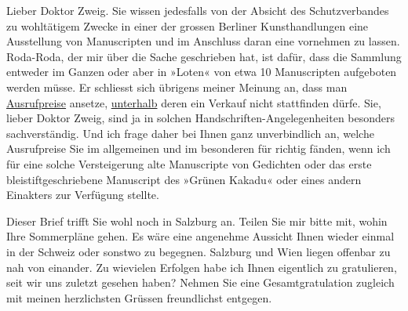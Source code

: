 \pstart{}Lieber Doktor Zweig.\pend\vspace{0.5em}
\pstart
           Sie wissen jedesfalls von der Absicht des Schutzverbandes zu wohltätigem Zwecke in einer der grossen Berliner Kunsthandlungen eine Ausstellung von Manuscripten und
               im Anschluss daran eine \label{K_L03743-11v}\label{K_L03743-11} vornehmen zu lassen. Roda-Roda, der mir über die Sache geschrieben hat, ist dafür,
               dass die Sammlung entweder im Ganzen oder aber in »Loten« von etwa 10 Manuscripten
               aufgeboten werden müsse. Er schliesst sich übrigens meiner Meinung an, dass man \uline{Ausrufpreise} ansetze, \uline{unterhalb} deren ein Verkauf nicht stattfinden dürfe. Sie, lieber Doktor
               Zweig, sind ja in solchen Handschriften-Angelegenheiten besonders sachverständig. Und
               ich frage daher bei Ihnen ganz unverbindlich an, welche Ausrufpreise Sie im
               allgemeinen und im besonderen für richtig fänden, wenn ich \label{K_L03743-1v}\label{K_L03743-1} für eine solche Versteigerung alte Manuscripte von Gedichten oder
                   das erste bleistiftgeschriebene
               Manuscript des »Grünen Kakadu« oder eines \introOben{}andern\introOben{} Einakters zur Verfügung stellte. \pend
           
\pstart
           Dieser Brief trifft Sie wohl noch in Salzburg an.
               Teilen Sie mir bitte mit, wohin Ihre Sommerpläne gehen. Es wäre eine angenehme
               Aussicht Ihnen wieder einmal in der Schweiz
               oder sonstwo zu begegnen. Salzburg und Wien liegen offenbar zu nah von einander. Zu
               wievielen Erfolgen habe ich Ihnen eigentlich zu gratulieren, seit wir uns zuletzt
               gesehen haben? Nehmen Sie eine Gesamtgratulation zugleich mit meinen herzlichsten
               Grüssen freundlichst entgegen. \pend
           
